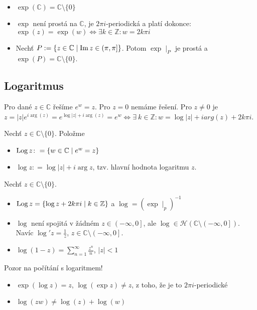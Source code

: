 \begin{properties}
\begin{itemize}
    \item $\exp(\mathbb{C})=\mathbb{C}\setminus\{0\}$ 
    \item $\exp$ není prostá na $\mathbb{C}$, je $2\pi i$-periodická a platí dokonce:
    \newline
    $\exp(z) =\exp(w) \iff\exists k \in\mathbb{Z}\colon w=2k\pi i$
     \item Nechť $P:=\{z\in\mathbb{C}\mid \operatorname{Im} z \in \left (\pi,\pi\right ]\}$.
     Potom $\exp\mid_P$ je prostá a $\exp(P)=\mathbb{C}\setminus\{0\}$.
\end{itemize}
\end{properties}


\subsection{Logaritmus}

Pro dané $z\in\mathbb{C}$ řešíme $e^w=z$. Pro $z=0$ nemáme řešení. Pro $z\neq 0$ je $z=\lvert z \rvert e^{i  \arg(z)}=e^{\log\lvert z \rvert+i   \arg(z)}=e^w\iff\exists\ k \in\mathbb{Z}\colon w=\log \lvert z \rvert +i arg(z)+2k\pi i$.

\begin{definition}
Nechť $z\in\mathbb{C}\setminus\{0\}$. Položme 
\begin{itemize}
    \item $\operatorname*{Log} z\colon=\{w\in\mathbb{C}\mid e^w=z\}$
    \item $\log z\colon= \log\lvert z \rvert + i \arg z$,  tzv. hlavní hodnota logaritmu $z$.
\end{itemize}
\end{definition}

\begin{properties}
Nechť $z \in\mathbb{C}\setminus\{0\}$.
\begin{itemize}
    \item $\operatorname*{Log} z =\{\log z +2k\pi i\mid k\in\mathbb{Z}\}$ a $
    \log =(\exp{}\mid _p)^{-1}$
    \item $\log{}$ není spojitá v žádném $z\in\left (-\infty,0\right ]$, ale $\log{}\in \mathcal{H}(\mathbb{C}\setminus\left (-\infty,0\right ])$.
    \newline Navíc $\log'z=\frac{1}{z}$, $z\in\mathbb{C}\setminus\left (-\infty,0\right ]$.
     \item $\log(1-z)=\sum_{n=1}^{\infty}\frac{z^n}{n}$, $\lvert z \rvert<1$
\end{itemize}

 Pozor na počítání s logaritmem!

 \begin{itemize}
     \item $\exp(\log z)=z$, $\log(\exp{z})\neq z$, z toho, že je to $2\pi i$-periodické
     \item $\log(z w)\neq \log(z) + \log(w)$
 \end{itemize}
\end{properties}

